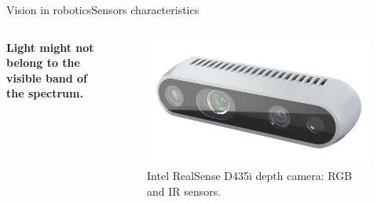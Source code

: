 \begin{frame}{Vision in robotics}{Sensors characteristics}
	\begin{columns}
		\begin{block}{}
			\centering
			\textbf{Light might not belong to the visible band of the spectrum.}
		\end{block}

		\begin{figure}
			\centering
			\includegraphics[width=\textwidth]{d435i}
			\caption{Intel RealSense D435i depth camera: RGB and IR sensors.}
			\label{fig:d435i}
		\end{figure}
	\end{columns}
\end{frame}
